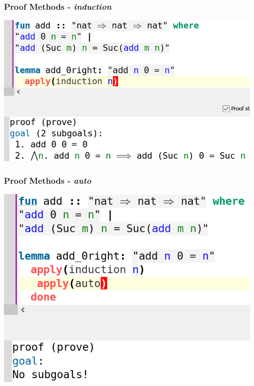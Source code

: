 \documentclass{beamer}
\begin{document}
  \begin{frame}
    \frametitle{Proof Methods - \textit{induction}}
    \centering
    \includegraphics[scale=0.7]{images/induction.png}
  \end{frame}

  \begin{frame}
    \frametitle{Proof Methods - \textit{auto}}
    \centering
    \includegraphics[scale=0.7]{images/auto.png}
  \end{frame}
\end{document}
